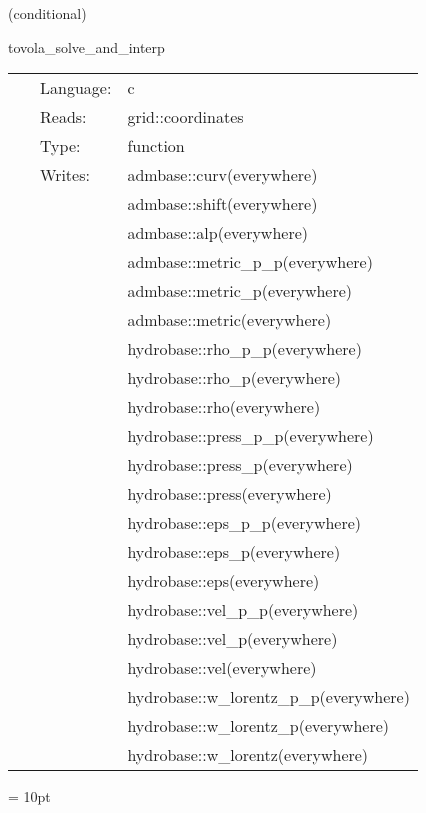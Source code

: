 \vspace{5mm}

   (conditional) 

\hspace{5mm} tovola\_solve\_and\_interp 

\hspace{5mm}{\it performs/drives the tov initial data solution algorithm. calls the integration function for the raw data, normalizes the data to make it more usable, and interpolates to the et grid. } 


\hspace{5mm}

 \begin{tabular*}{160mm}{cll} 
~ & Language:  & c \\ 
~ & Reads:  & grid::coordinates \\ 
~ & Type:  & function \\ 
~ & Writes:  & admbase::curv(everywhere) \\ 
~& ~ &admbase::shift(everywhere)\\ 
~& ~ &admbase::alp(everywhere)\\ 
~& ~ &admbase::metric\_p\_p(everywhere)\\ 
~& ~ &admbase::metric\_p(everywhere)\\ 
~& ~ &admbase::metric(everywhere)\\ 
~& ~ &hydrobase::rho\_p\_p(everywhere)\\ 
~& ~ &hydrobase::rho\_p(everywhere)\\ 
~& ~ &hydrobase::rho(everywhere)\\ 
~& ~ &hydrobase::press\_p\_p(everywhere)\\ 
~& ~ &hydrobase::press\_p(everywhere)\\ 
~& ~ &hydrobase::press(everywhere)\\ 
~& ~ &hydrobase::eps\_p\_p(everywhere)\\ 
~& ~ &hydrobase::eps\_p(everywhere)\\ 
~& ~ &hydrobase::eps(everywhere)\\ 
~& ~ &hydrobase::vel\_p\_p(everywhere)\\ 
~& ~ &hydrobase::vel\_p(everywhere)\\ 
~& ~ &hydrobase::vel(everywhere)\\ 
~& ~ &hydrobase::w\_lorentz\_p\_p(everywhere)\\ 
~& ~ &hydrobase::w\_lorentz\_p(everywhere)\\ 
~& ~ &hydrobase::w\_lorentz(everywhere)\\ 
\end{tabular*} 



\vspace{5mm}\parskip = 10pt 

